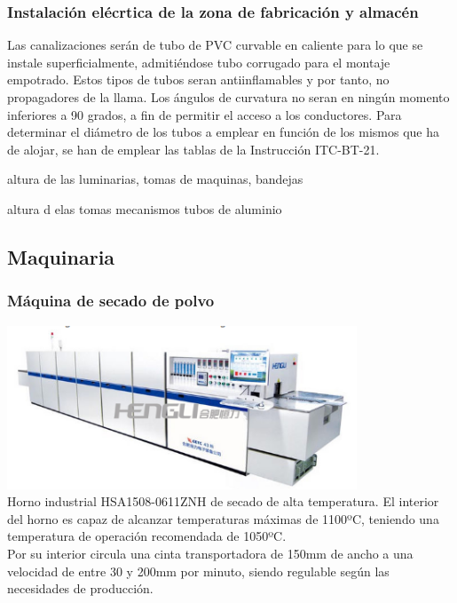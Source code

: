 \subsubsection{Instalación elécrtica de la zona de fabricación y almacén}

Las canalizaciones serán de tubo de PVC curvable en caliente para lo que se instale superficialmente, admitiéndose tubo corrugado para el montaje empotrado. Estos tipos de tubos seran antiinflamables y por tanto, no propagadores de la llama.
Los ángulos de curvatura no seran en ningún momento inferiores a 90 grados, a fin de permitir el acceso a los conductores.
Para determinar el diámetro de los tubos a emplear en función de los mismos que ha de alojar, se han de emplear las tablas de la Instrucción ITC-BT-21.




altura de las luminarias, tomas de maquinas, bandejas

altura d elas tomas mecanismos tubos de aluminio



\subsection{Maquinaria}
	\subsubsection{Máquina de secado de polvo}

	\includegraphics[scale=1]{Datasheets/1HornoFoto.png}\\

	Horno industrial HSA1508-0611ZNH de secado de alta temperatura. El interior del horno es capaz de alcanzar temperaturas máximas de 1100ºC, teniendo una temperatura de operación recomendada de 1050ºC.\\

	Por su interior circula una cinta transportadora de 150mm de ancho a una velocidad de entre 30 y 200mm por minuto, siendo regulable según las necesidades de producción.\\

